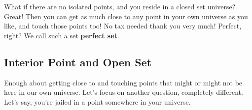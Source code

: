 \documentclass{article}
\begin{document}
What if there are no isolated points, and you reside in a closed set universe? Great! Then you can get as much close to any point in your own universe as you like, and touch those points too! No tax needed thank you very much! Perfect, right? We call such a set \textbf{perfect set}.

\subsection{Interior Point and Open Set}
Enough about getting close to and touching points that might or might not be here in our own universe. Let's focus on another question, completely different. Let's say, you're jailed in a point somewhere in your universe.
\end{document}
